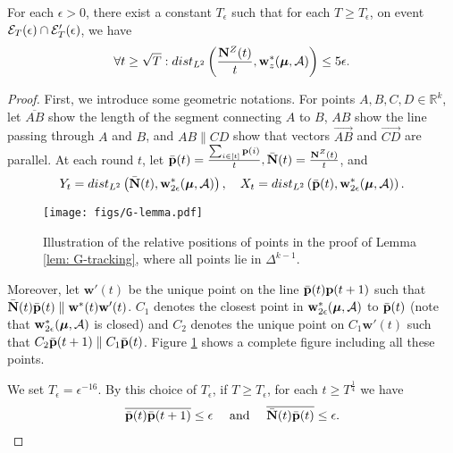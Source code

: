     \begin{lemma} \label{lem: G-tracking}
        For each $\epsilon > 0$, there exist a constant $T_{\epsilon}$ such that for each $T \geq T_{\epsilon}$, on event $\mathcal{E}_T(\epsilon) \cap \mathcal{E}'_T(\epsilon)$, we have 
        \begin{align*}
            \forall t \geq \sqrt{T} : dist_{L^2}\left(\frac{\mathbf{N}^{Z}(t)}{t}, \mathbf{w}_z^*(\boldsymbol{\mu}, \mathcal{A})\right) \leq 5 \epsilon. 
        \end{align*}
    \end{lemma}
    \begin{proof}      
        First, we introduce some geometric notations. For points $A, B, C, D \in \mathbb{R}^k$, let $\overline{AB}$ show the length of the segment connecting $A$ to $B$, $AB$ show the line passing through $A$ and $B$, and $AB \parallel CD$ show that vectors $\overrightarrow{AB}$ and $\overrightarrow{CD}$ are parallel. At each round $t$, let $\bar{\mathbf{p}}(t) = \frac{\sum_{i \in [t]}\mathbf{p}(i)}{t}, \bar{\mathbf{N}}(t) = \frac{\mathbf{N}^{Z}(t)}{t}$, and
        \begin{align*}
            Y_t = dist_{L^2}\left(\bar{\mathbf{N}}(t), \mathbf{w}^*_{2\epsilon}(\boldsymbol{\mu}, \mathcal{A})\right), \quad X_t = dist_{L^2}\left(\bar{\mathbf{p}}(t), \mathbf{w}^*_{2\epsilon}(\boldsymbol{\mu}, \mathcal{A})\right). 
        \end{align*}

        \begin{figure}[H]
            \centering
            \texttt{[image: figs/G-lemma.pdf]}
            \caption{Illustration of the relative positions of points in the proof of Lemma \ref{lem: G-tracking}, where all points lie in $\Delta^{k-1}$.}
            \label{fig: G-lemma}
        \end{figure}
    
        Moreover, let $\mathbf{w}'(t)$ be the unique point on the line $\bar{\mathbf{p}}(t) \mathbf{p}(t+1)$ such that $\bar{\mathbf{N}}(t)\bar{\mathbf{p}}(t) \parallel \mathbf{w}^{*}(t)\mathbf{w}'(t)$. $C_1$ denotes the closest point in $\mathbf{w}^*_{2 \epsilon}(\boldsymbol{\mu}, \mathcal{A})$ to $\bar{\mathbf{p}}(t)$ (note that $\mathbf{w}^*_{2 \epsilon}(\boldsymbol{\mu}, \mathcal{A})$ is closed) and $C_2$ denotes the unique point on $C_1 \mathbf{w}'(t)$ such that $C_2 \bar{\mathbf{p}}(t+1) \parallel C_1 \bar{\mathbf{p}}(t)$. Figure \ref{fig: G-lemma} shows a complete figure including all these points. 
    
        We set $T_{\epsilon} = \epsilon^{-16}$. By this choice of $T_{\epsilon}$, if $T \geq T_{\epsilon}$, for each $t \geq T^{\frac14}$ we have  
        \begin{align} \label{eq: g-lemma-eq3}
            \overline{\bar{\mathbf{p}}(t) \bar{\mathbf{p}}(t+1)} \leq \epsilon \quad \text{ and } \quad \overline{\bar{\mathbf{N}}(t) \bar{\mathbf{p}}(t)} \leq \epsilon. 
        \end{align}
        

\end{proof}
